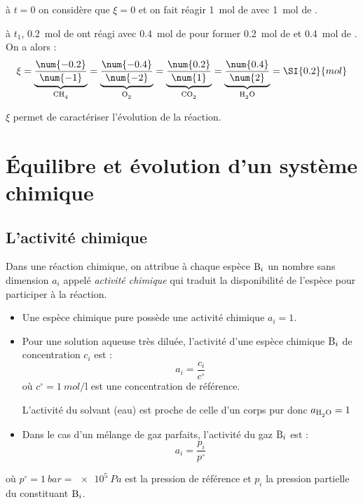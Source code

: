 \documentclass[MPSI]{cours}
\begin{document}
à $t=0$ on considère que $\xi=0$ et on fait réagir \SI{1}{mol} de  avec \SI{1}{mol} de .

à $t_1$, \SI{0.2}{mol} de  ont réagi avec \SI{0.4}{mol} de  pour former \SI{0.2}{mol} de  et \SI{0.4}{mol} de . On a alors :
\begin{equation*}
  \xi = \underbrace{\frac{\num{-0.2}}{\num{-1}}}_{\ce{CH4}} = \underbrace{\frac{\num{-0.4}}{\num{-2}}}_{\ce{O2}}= \underbrace{\frac{\num{0.2}}{\num{1}}}_{\ce{CO2}}= \underbrace{\frac{\num{0.4}}{\num{2}}}_{\ce{H2O}} = \SI{0.2}{mol}
\end{equation*}

$\xi$ permet de caractériser l'évolution de la réaction.

\section{Équilibre et évolution d'un système chimique}%
\label{sec:équilibre_et_évolution_d_un_système_chimique}
\subsection{L'activité chimique}%
\label{sub:l_activité_chimique}
Dans une réaction chimique, on attribue à chaque espèce $\ce{B}_i$ un nombre sans dimension $a_i$ appelé \emph{activité chimique} qui traduit la disponibilité de l'espèce pour participer à la réaction.

\begin{itemize}
  \item Une espèce chimique pure possède une activité chimique $a_i=1$. 
  \item Pour une solution aqueuse très diluée, l'activité d'une espèce chimique $\ce{B}_i$ de concentration $c_i$ est : 
  \begin{equation*}
    a_i = \frac{c_i}{c^\circ{}}
  \end{equation*}
  où $c^\circ{}=\SI{1}{mol/\litre}$ est une concentration de référence.

  L'activité du solvant (eau) est proche de celle d'un corps pur donc $a_{\ce{H2O}}=1$ 

  \item Dans le cas d'un mélange de gaz parfaits, l'activité du gaz $\ce{B}_i$ est :
  \begin{equation*}
    a_i = \frac{p_i}{p^\circ{}}
  \end{equation*}
\end{itemize}
où $p^\circ{}=\SI{1}{bar}=\SI{e5}{Pa}$ est la pression de référence et $p_i$ la pression partielle du constituant $\ce{B}_i$. 
\end{document}
